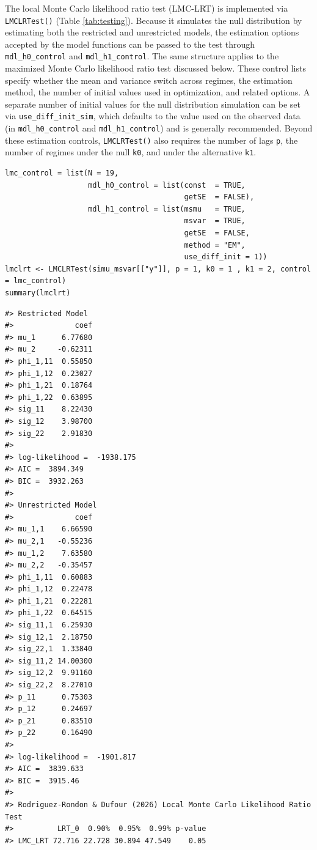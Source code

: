 The local Monte Carlo likelihood ratio test (LMC-LRT) is implemented via \texttt{LMCLRTest()} (Table \ref{tab:testing}). Because it simulates the null distribution by estimating both the restricted and unrestricted models, the estimation options accepted by the model functions can be passed to the test through \texttt{mdl\_h0\_control} and \texttt{mdl\_h1\_control}. The same structure applies to the maximized Monte Carlo likelihood ratio test discussed below. These control lists specify whether the mean and variance switch across regimes, the estimation method, the number of initial values used in optimization, and related options. A separate number of initial values for the null distribution simulation can be set via \texttt{use\_diff\_init\_sim}, which defaults to the value used on the observed data (in \texttt{mdl\_h0\_control} and \texttt{mdl\_h1\_control}) and is generally recommended. Beyond these estimation controls, \texttt{LMCLRTest()} also requires the number of lags \texttt{p}, the number of regimes under the null \texttt{k0}, and under the alternative \texttt{k1}.

\begin{verbatim}
lmc_control = list(N = 19,
                   mdl_h0_control = list(const  = TRUE,
                                         getSE  = FALSE),
                   mdl_h1_control = list(msmu   = TRUE,
                                         msvar  = TRUE,
                                         getSE  = FALSE,
                                         method = "EM",
                                         use_diff_init = 1))
lmclrt <- LMCLRTest(simu_msvar[["y"]], p = 1, k0 = 1 , k1 = 2, control = lmc_control)
summary(lmclrt)
\end{verbatim}

\begin{verbatim}
#> Restricted Model
#>              coef
#> mu_1      6.77680
#> mu_2     -0.62311
#> phi_1,11  0.55850
#> phi_1,12  0.23027
#> phi_1,21  0.18764
#> phi_1,22  0.63895
#> sig_11    8.22430
#> sig_12    3.98700
#> sig_22    2.91830
#> 
#> log-likelihood =  -1938.175
#> AIC =  3894.349
#> BIC =  3932.263
#> 
#> Unrestricted Model
#>              coef
#> mu_1,1    6.66590
#> mu_2,1   -0.55236
#> mu_1,2    7.63580
#> mu_2,2   -0.35457
#> phi_1,11  0.60883
#> phi_1,12  0.22478
#> phi_1,21  0.22281
#> phi_1,22  0.64515
#> sig_11,1  6.25930
#> sig_12,1  2.18750
#> sig_22,1  1.33840
#> sig_11,2 14.00300
#> sig_12,2  9.91160
#> sig_22,2  8.27010
#> p_11      0.75303
#> p_12      0.24697
#> p_21      0.83510
#> p_22      0.16490
#> 
#> log-likelihood =  -1901.817
#> AIC =  3839.633
#> BIC =  3915.46
#> 
#> Rodriguez-Rondon & Dufour (2026) Local Monte Carlo Likelihood Ratio Test
#>          LRT_0  0.90%  0.95%  0.99% p-value
#> LMC_LRT 72.716 22.728 30.894 47.549    0.05
\end{verbatim}


